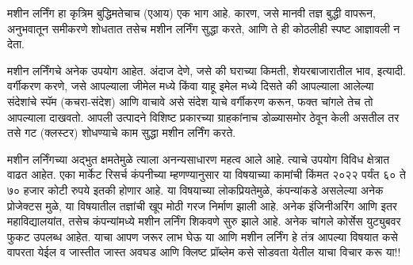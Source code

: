 मशीन लर्निंग हा कृत्रिम बुद्धिमतेचाच (एआय) एक भाग आहे. कारण, जसे मानवी तज्ञ बुद्धी वापरून, अनुभवातून समीकरणे शोधतात तसेच मशीन लर्निंग सुद्धा करते, आणि ते ही कोठलीही स्पष्ट आज्ञावली न देता.

मशीन लर्निंगचे अनेक उपयोग आहेत. अंदाज देणे, जसे की  घराच्या किमती, शेयरबाजारातील भाव, इत्यादी. वर्गीकरण करणे, जसे आपल्याला जीमेल मध्ये किंवा याहू इमेल मध्ये दिसते की आपल्याला आलेल्या संदेशांचे स्पॅम (कचरा-संदेश) आणि वाचावे असे संदेश याचे वर्गीकरण करून, फक्त चांगले तेच तो आपल्याला दाखवतो. आपली उत्पादने विशिष्ट प्रकारच्या ग्राहकांनाच डोळ्यासमोर ठेवून केली असतील तर तसे गट (क्लस्टर) शोधण्याचे काम सुद्धा मशीन लर्निंग करते.

मशीन लर्निंगच्या अद्भुत क्षमतेमुळे त्याला अनन्यसाधारण महत्व आले आहे. त्याचे उपयोग विविध क्षेत्रात वाढत आहेत. एका मार्केट रिसर्च कंपनीच्या म्हणण्यानुसार या विषयाच्या कामांची किंमत २०२२ पर्यंत ६० ते ७० हजार कोटी रुपये इतकी होणार आहे. या विषयाच्या लोकप्रियतेमुळे, कंपन्यांकडे असलेल्या अनेक प्रोजेक्टस मुळे, या विषयातील तज्ञांची खूप मोठी गरज निर्माण झाली आहे. अनेक इंजिनीअरिंग आणि इतर महाविद्यालयांत, तसेच कंपन्यांमध्ये मशीन लर्निंग शिकवणे सुरु झाले आहे. अनेक चांगले कोर्सेस युट्युबवर फुकट उपलब्ध आहेत. याचा आपण जरूर लाभ घेऊ या आणि मशीन लर्निंग हे तंत्र आपल्या विषयात कसे वापरता येईल व जास्तीत जास्त अवघड आणि क्लिष्ट प्रॉब्लेम कसे सोडवता येतील याचा विचार करू या!!